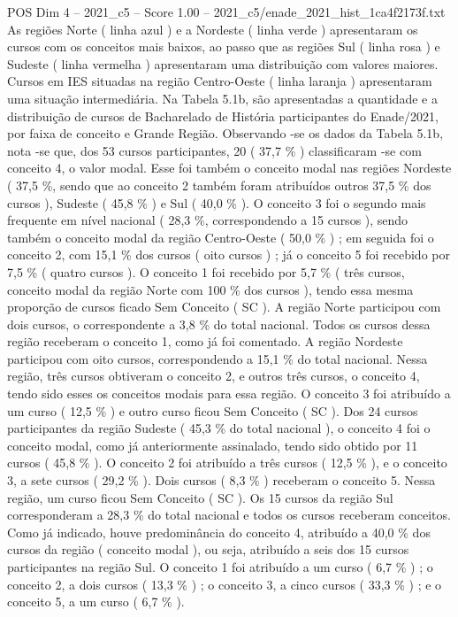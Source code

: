 \begin{textsample}{POS Dim 4 – 2021\_c5 – Score 1.00 – 2021\_c5/enade\_2021\_hist\_1ca4f2173f.txt}
As regiões Norte ( linha azul ) e a Nordeste ( linha verde ) apresentaram os cursos com os conceitos mais baixos, ao passo que as regiões Sul ( linha rosa ) e Sudeste ( linha vermelha ) apresentaram uma distribuição com valores maiores.
Cursos em IES situadas na região Centro-Oeste ( linha laranja ) apresentaram uma situação intermediária.
Na Tabela 5.1b, são apresentadas a quantidade e a distribuição de cursos de Bacharelado de História participantes do Enade/2021, por faixa de conceito e Grande Região.
Observando -se os dados da Tabela 5.1b, nota -se que, dos 53 cursos participantes, 20 ( 37,7 \% ) classificaram -se com conceito 4, o valor modal.
Esse foi também o conceito modal nas regiões Nordeste ( 37,5 \%, sendo que ao conceito 2 também foram atribuídos outros 37,5 \% dos cursos ), Sudeste ( 45,8 \% ) e Sul ( 40,0 \% ).
O conceito 3 foi o segundo mais frequente em nível nacional ( 28,3 \%, correspondendo a 15 cursos ), sendo também o conceito modal da região Centro-Oeste ( 50,0 \% ) ; em seguida foi o conceito 2, com 15,1 \% dos cursos ( oito cursos ) ; já o conceito 5 foi recebido por 7,5 \% ( quatro cursos ).
O conceito 1 foi recebido por 5,7 \% ( três cursos, conceito modal da região Norte com 100 \% dos cursos ), tendo essa mesma proporção de cursos ficado Sem Conceito ( SC ).
A região Norte participou com dois cursos, o correspondente a 3,8 \% do total nacional.
Todos os cursos dessa região receberam o conceito 1, como já foi comentado.
A região Nordeste participou com oito cursos, correspondendo a 15,1 \% do total nacional.
Nessa região, três cursos obtiveram o conceito 2, e outros três cursos, o conceito 4, tendo sido esses os conceitos modais para essa região.
O conceito 3 foi atribuído a um curso ( 12,5 \% ) e outro curso ficou Sem Conceito ( SC ).
Dos 24 cursos participantes da região Sudeste ( 45,3 \% do total nacional ), o conceito 4 foi o conceito modal, como já anteriormente assinalado, tendo sido obtido por 11 cursos ( 45,8 \% ).
O conceito 2 foi atribuído a três cursos ( 12,5 \% ), e o conceito 3, a sete cursos ( 29,2 \% ).
Dois cursos ( 8,3 \% ) receberam o conceito 5.
Nessa região, um curso ficou Sem Conceito ( SC ).
Os 15 cursos da região Sul corresponderam a 28,3 \% do total nacional e todos os cursos receberam conceitos.
Como já indicado, houve predominância do conceito 4, atribuído a 40,0 \% dos cursos da região ( conceito modal ), ou seja, atribuído a seis dos 15 cursos participantes na região Sul.
O conceito 1 foi atribuído a um curso ( 6,7 \% ) ; o conceito 2, a dois cursos ( 13,3 \% ) ; o conceito 3, a cinco cursos ( 33,3 \% ) ; e o conceito 5, a um curso ( 6,7 \% ).

\end{textsample}
